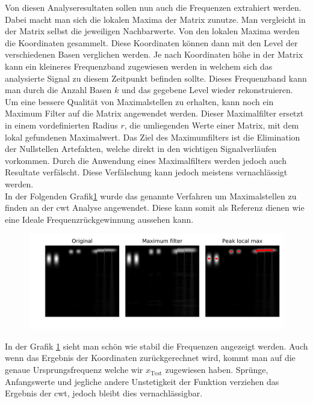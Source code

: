 \newpage

Von diesen Analyseresultaten sollen nun auch die Frequenzen extrahiert werden. Dabei macht man sich die lokalen Maxima der Matrix zunutze. Man vergleicht in der Matrix selbst die jeweiligen Nachbarwerte. Von den lokalen Maxima werden die Koordinaten gesammelt. Diese Koordinaten können dann mit den Level der verschiedenen Basen verglichen werden. Je nach Koordinaten höhe in der Matrix kann ein kleineres Frequenzband zugewiesen werden in welchem sich das analysierte Signal zu diesem Zeitpunkt befinden sollte. Dieses Frequenzband kann man durch die Anzahl Basen $k$  und das gegebene Level wieder rekonstruieren.\\

Um eine bessere Qualität von Maximalstellen zu erhalten, kann noch ein Maximum Filter auf die Matrix angewendet werden. Dieser Maximalfilter ersetzt in einem vordefinierten Radius $r$, die umliegenden Werte einer Matrix, mit dem lokal gefundenen Maximalwert. Das Ziel des Maximumfilters ist die Elimination der Nullstellen Artefakten, welche direkt in den wichtigen Signalverläufen vorkommen. Durch die Anwendung eines Maximalfilters werden jedoch auch Resultate verfälscht. Diese Verfälschung kann jedoch meistens vernachlässigt werden.\\

In der Folgenden Grafik\ref{fig:cwt_max} wurde das genannte Verfahren um Maximalstellen zu finden an der cwt Analyse angewendet. Diese kann somit als Referenz dienen wie eine Ideale Frequenzrückgewinnung aussehen kann. 

\begin{figure}[!ht]
	\centering
	\includegraphics[width=\linewidth]{papers/autotune/sections/frames/images/cwtmaxima.jpg}
	\label{fig:cwt_max}
\end{figure}%

In der Grafik \ref{fig:cwt_max} sieht man schön wie stabil die Frequenzen angezeigt werden. Auch wenn das Ergebnis der Koordinaten zurückgerechnet wird, kommt man auf die genaue Ursprungsfrequenz welche wir $x_{\text{Test}}$ zugewiesen haben. Sprünge, Anfangswerte und jegliche andere Unstetigkeit der Funktion verziehen das Ergebnis der cwt, jedoch bleibt dies vernachlässigbar.
\\

